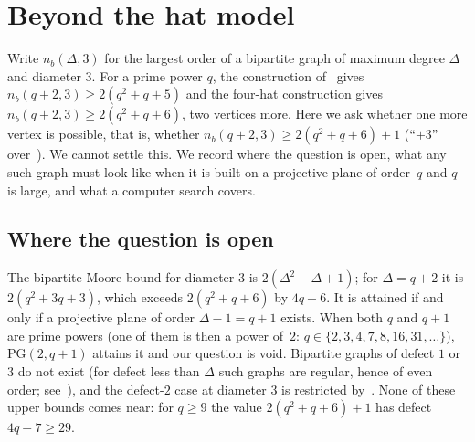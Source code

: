 \providecommand{\PG}{\mathrm{PG}}
\providecommand{\cP}{\mathcal{P}}
\providecommand{\cL}{\mathcal{L}}
\providecommand{\cX}{\mathcal{X}}

\section{Beyond the hat model}\label{sec:plus3}

Write $n_b(\Delta,3)$ for the largest order of a bipartite graph of maximum degree $\Delta$ and diameter $3$.
For a prime power $q$, the construction of~\cite{AL} gives $n_b(q+2,3) \ge 2(q^2+q+5)$ and the four-hat
construction gives $n_b(q+2,3) \ge 2(q^2+q+6)$, two vertices more. Here we ask whether one more vertex is
possible, that is, whether $n_b(q+2,3) \ge 2(q^2+q+6)+1$ (``$+3$'' over~\cite{AL}).
We cannot settle this. We record where the question is open, what any such graph must look like when it is
built on a projective plane of order~$q$ and $q$ is large, and what a computer search covers.

\subsection{Where the question is open}\label{ssec:frontier}
The bipartite Moore bound for diameter $3$ is $2(\Delta^2-\Delta+1)$; for $\Delta = q+2$ it is $2(q^2+3q+3)$, which
exceeds $2(q^2+q+6)$ by $4q-6$. It is attained if and only if a projective plane of order $\Delta-1 = q+1$ exists.
When both $q$ and $q+1$ are prime powers (one of them is then a power of~$2$: $q \in \{2,3,4,7,8,16,31,\dots\}$),
$\PG(2,q+1)$ attains it and our question is void. Bipartite graphs of defect $1$ or $3$ do not exist
(for defect less than $\Delta$ such graphs are regular, hence of even order; see~\cite[Prop.~3.1]{FPPV}),
and the defect-$2$ case at diameter $3$ is restricted by~\cite{DJMP}. None of these upper bounds comes near:
for $q \ge 9$ the value $2(q^2+q+6)+1$ has defect $4q-7 \ge 29$.

